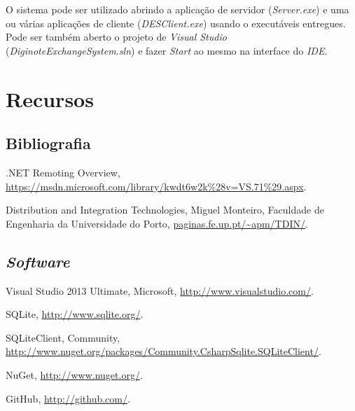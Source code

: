 \documentclass[12pt]{article}
\begin{document}
O sistema pode ser utilizado abrindo a aplicação de servidor (\textit{Server.exe}) e uma ou várias aplicações de cliente (\textit{DESClient.exe}) usando o executáveis entregues. Pode ser também aberto o projeto de \textit{Visual Studio} (\textit{DiginoteExchangeSystem.sln}) e fazer \textit{Start} ao mesmo na interface do \textit{IDE}.

\section{Recursos}

\subsection{Bibliografia}
\begin{description}
\item .NET Remoting Overview, \url{https://msdn.microsoft.com/library/kwdt6w2k\%28v=VS.71\%29.aspx}.
\item Distribution and Integration Technologies, Miguel Monteiro, Faculdade de Engenharia da Universidade do Porto, \url{paginas.fe.up.pt/~apm/TDIN/}.
\end{description}
\subsection{\it{Software}}
\begin{description}
\item Visual Studio 2013 Ultimate, Microsoft, \url{http://www.visualstudio.com/}.
\item SQLite, \url{http://www.sqlite.org/}.
\item SQLiteClient, Community, \url{http://www.nuget.org/packages/Community.CsharpSqlite.SQLiteClient/}.
\item NuGet, \url{http://www.nuget.org/}.
\item GitHub, \url{http://github.com/}.
\end{description}
\end{document}
